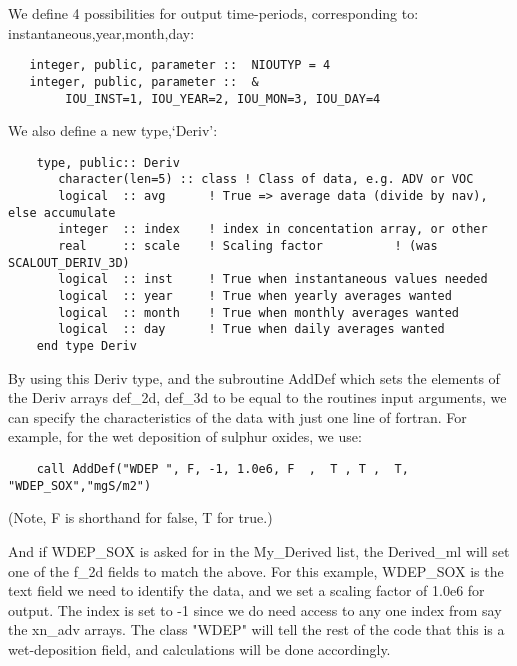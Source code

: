   We define 4 possibilities
  for output time-periods, corresponding to: instantaneous,year,month,day:

  \begin{small}\begin{verbatim}
   integer, public, parameter ::  NIOUTYP = 4
   integer, public, parameter ::  & 
        IOU_INST=1, IOU_YEAR=2, IOU_MON=3, IOU_DAY=4
  \end{verbatim}
  \end{small}


   We also define a new type,`Deriv':

  \begin{small}\begin{verbatim}
    type, public:: Deriv
       character(len=5) :: class ! Class of data, e.g. ADV or VOC
       logical  :: avg      ! True => average data (divide by nav), else accumulate
       integer  :: index    ! index in concentation array, or other
       real     :: scale    ! Scaling factor          ! (was SCALOUT_DERIV_3D)
       logical  :: inst     ! True when instantaneous values needed
       logical  :: year     ! True when yearly averages wanted
       logical  :: month    ! True when monthly averages wanted
       logical  :: day      ! True when daily averages wanted
    end type Deriv
  \end{verbatim}
  \end{small}


  By using this Deriv type, and the subroutine AddDef which sets the elements of the
  Deriv arrays
  def\_2d, def\_3d to be equal to the routines input arguments, we can specify the characteristics of the data
  with just one line of fortran. For example, for the wet deposition of
  sulphur oxides, we use:


  \begin{small}
\begin{verbatim}
    call AddDef("WDEP ", F, -1, 1.0e6, F  ,  T , T ,  T, "WDEP_SOX","mgS/m2")
  \end{verbatim}
  \end{small}

  (Note, F is shorthand for false, T for true.)\\
  \bigskip


 \noindent
  And if WDEP\_SOX is asked for in the My\_Derived list, the Derived\_ml will
  set one of the f\_2d fields to match the above.
  For this example, WDEP\_SOX is the text field we need to identify the
  data, and we set a scaling factor of 1.0e6 for output. The index
  is set to -1 since we do need access to any one index from say 
  the xn\_adv arrays.
   The class
  "WDEP" will tell the rest of the code that this is a wet-deposition field,
   and  calculations will be done accordingly. 

